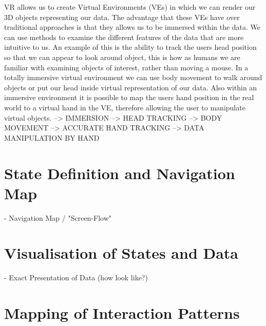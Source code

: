 VR allows us to create Virtual Environments (VEs) in which we can render our 3D objects representing our data. The advantage that these VEs have over traditional approaches is that they allows us to be immersed within the data. We can use methods to examine the different features of the data that are more intuitive to us. An example of this is the ability to track the users head position so that we can appear to look around object, this is how as humans we are familiar with examining objects of interest, rather than moving a mouse. In a totally immersive virtual environment we can use body movement to walk around objects or put our head inside virtual representation of our data. Also within an immersive environment it is possible to map the users hand position in the real world to a virtual hand in the VE, therefore allowing the user to manipulate virtual objects.
\cite{Jamieson2007}
--> IMMERSION
--> HEAD TRACKING
--> BODY MOVEMENT
--> ACCURATE HAND TRACKING
--> DATA MANIPULATION BY HAND





\section{State Definition and Navigation Map}


- Navigation Map / "Screen-Flow"



\section{Visualisation of States and Data}

- Exact Presentation of Data (how look like?)



\section{Mapping of Interaction Patterns}

